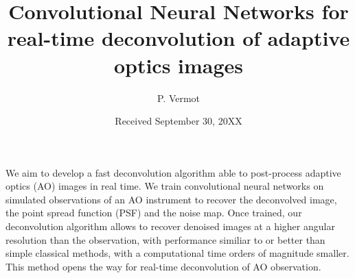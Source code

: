 \documentclass{aa}
\begin{document}
   \title{Convolutional Neural Networks for real-time deconvolution of adaptive optics images}


%

   \author{P. Vermot
        }


   \date{Received September 30, 20XX}

 
  \abstract
   {We aim to develop a fast deconvolution algorithm able to post-process adaptive optics (AO) images in real time.} 
   {We train convolutional neural networks on simulated observations of an AO instrument to recover the deconvolved image, the point spread function (PSF) and the noise map.}
   {Once trained, our deconvolution algorithm allows to recover denoised images at a higher angular resolution than the observation, with performance similiar to or better than simple classical methods, with a computational time orders of magnitude smaller.}
   {This method opens the way for real-time deconvolution of AO observation.}


   \maketitle
\end{document}
